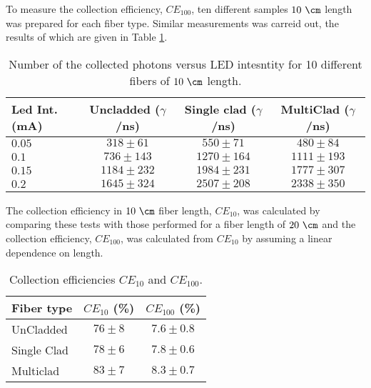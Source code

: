 To measure the collection efficiency, $CE_{100}$, ten different samples $10~\cm$ length was prepared for each fiber type. Similar measurements was carreid out, the results of which are given in Table \ref{tab:10DifferentSamplesAlltypes}.

\begin{table}[htbp]
\centering{}%
\begin{tabular}{lccc}
\toprule 
Led Int. (mA) & Uncladded ($\gamma$/ns) & Single clad ($\gamma$/ns) & MultiClad ($\gamma$/ns) \tabularnewline
\midrule
\midrule 
$0.05$ & $318 \pm 61$ & $550 \pm 71$ & $480 \pm 84$ \tabularnewline
$0.1$ & $736 \pm 143$ & $1270 \pm 164$ & $1111 \pm 193$ \tabularnewline
$0.15$ & $1184 \pm 232$ & $1984 \pm 231$ & $1777\pm 307$ \tabularnewline
$0.2$ & $1645 \pm 324$ & $2507 \pm 208$ & $2338 \pm 350$ \tabularnewline
\bottomrule
\end{tabular}
\caption{Number of the collected photons versus LED intesntity for 10 different fibers of $10~\cm$ length.}
\label{tab:10DifferentSamplesAlltypes}
\end{table}




The collection efficiency in $10~\cm$ fiber length, $CE_{10}$, was calculated by comparing these tests with those performed for a fiber length of $20~\cm$ and the collection efficiency, $CE_{100}$, was calculated from $CE_{10}$ by assuming a linear dependence on length.

\begin{table}[htbp]
\centering{}%
\begin{tabular}{lcc}
\toprule 
Fiber type & $CE_{10}$ (\%) & $CE_{100}$ (\%) \tabularnewline
\midrule
\midrule 
UnCladded & $76 \pm 8$ & $7.6 \pm 0.8$ \tabularnewline
Single Clad & $78 \pm 6$ & $7.8 \pm 0.6$ \tabularnewline
Multiclad & $83 \pm 7$ & $8.3 \pm 0.7$ \tabularnewline
\bottomrule
\end{tabular}
\caption{Collection efficiencies $CE_{10}$ and $CE_{100}$.}
\label{tab:CollectionEfficiencyOfFibers}
\end{table}


